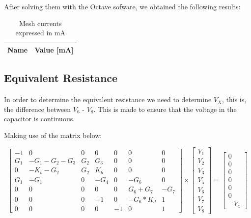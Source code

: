 After solving them with the Octave sofware, we obtained the following results:

\begin{table}[hbt!]
\centering
\begin{tabular}{|l|r|}
\hline    
{\bf Name} & {\bf Value [mA]} \\ \hline

\end{tabular}
\caption{Mesh currents expressed in mA}
\label{tab:op}
\end{table}

\subsection{Equivalent Resistance}

\paragraph{}In order to determine the equivalent resistance we need to determine $V_X$, this is, the difference between $V_6$ - $V_8$. This is made to ensure that the voltage in the capacitor is continuous.

Making use of the matrix below:

\begin{equation}
\begin{bmatrix}
	-1	&	0	&	0	&	0	&	0	&	0	&	0 \\
	G_1	&	-G_1 - G_2 - G_3	&	G_2	&	G_3	&	0	&	0	&	0 \\
	0	&	-K_b - G_2	&	G_2	&	K_b	&	0	&	0	&	0 \\
	G_1	&	-G_1	&	0	&	-G_4	&	0	&	-G_6	&	0 \\
	0	&	0	&	0	&	0	&	0	&	G_6 + G_7	&	-G_7 \\
	0	&	0	&	0	&	-1	&	0	&	-G_6 *	K_d	&	1 \\
	0	&	0	&	0	&	0	&	-1	&	0	&	1
\end{bmatrix}
\times
\begin{bmatrix}
	V_1 \\
	V_2 \\
	V_3 \\
	V_5 \\
	V_6 \\
	V_7 \\
	V_8
\end{bmatrix}
=
\begin{bmatrix}
	0 \\
	0 \\
	0 \\
	0 \\
	0 \\
	0 \\
	-V_x
	\label{m:1}
\end{bmatrix}
\end{equation}

